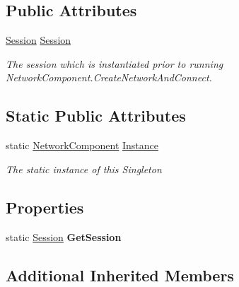 \subsection*{Public Attributes}
\begin{DoxyCompactItemize}
\item 
\hyperlink{class_skyrates_1_1_common_1_1_network_1_1_session}{Session} \hyperlink{class_skyrates_1_1_common_1_1_network_1_1_network_component_ab7c94c6c60a85549f3b7d22d1efcab05}{Session}
\begin{DoxyCompactList}\small\item\em The session which is instantiated prior to running Network\-Component.\-Create\-Network\-And\-Connect. \end{DoxyCompactList}\end{DoxyCompactItemize}
\subsection*{Static Public Attributes}
\begin{DoxyCompactItemize}
\item 
static \hyperlink{class_skyrates_1_1_common_1_1_network_1_1_network_component}{Network\-Component} \hyperlink{class_skyrates_1_1_common_1_1_network_1_1_network_component_a92cfb5ea7ee95888c7d9356e6e1add2f}{Instance}
\begin{DoxyCompactList}\small\item\em The static instance of this Singleton \end{DoxyCompactList}\end{DoxyCompactItemize}
\subsection*{Properties}
\begin{DoxyCompactItemize}
\item 
\hypertarget{class_skyrates_1_1_common_1_1_network_1_1_network_component_a00a4710b2204b9d524bfc04e0888ca0b}{static \hyperlink{class_skyrates_1_1_common_1_1_network_1_1_session}{Session} {\bfseries Get\-Session}}\label{class_skyrates_1_1_common_1_1_network_1_1_network_component_a00a4710b2204b9d524bfc04e0888ca0b}

\end{DoxyCompactItemize}
\subsection*{Additional Inherited Members}


